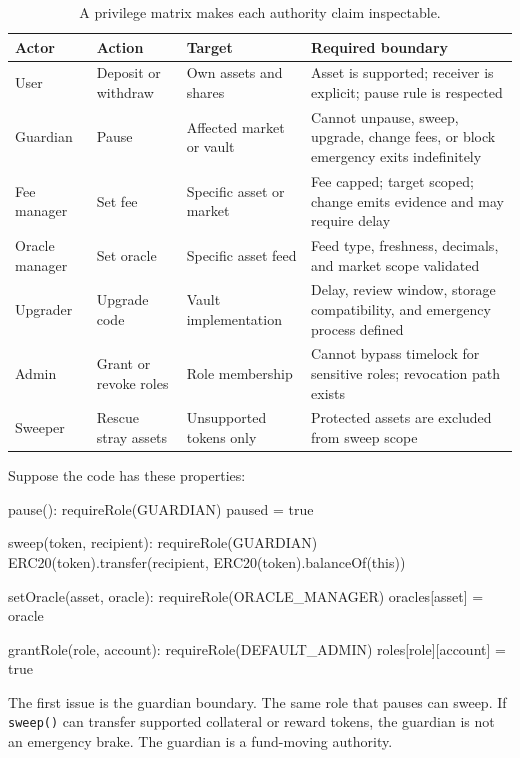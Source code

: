 \begin{table}[htbp]
\centering
\small
\renewcommand{\arraystretch}{1.15}
\begin{tabularx}{\textwidth}{@{}>{\RaggedRight\arraybackslash}p{}>{\RaggedRight\arraybackslash}p{}>{\RaggedRight\arraybackslash}p{}X@{}}
\toprule
Actor & Action & Target & Required boundary \\
\midrule
User & Deposit or withdraw & Own assets and shares & Asset is supported; receiver is explicit; pause rule is respected \\
Guardian & Pause & Affected market or vault & Cannot unpause, sweep, upgrade, change fees, or block emergency exits indefinitely \\
Fee manager & Set fee & Specific asset or market & Fee capped; target scoped; change emits evidence and may require delay \\
Oracle manager & Set oracle & Specific asset feed & Feed type, freshness, decimals, and market scope validated \\
Upgrader & Upgrade code & Vault implementation & Delay, review window, storage compatibility, and emergency process defined \\
Admin & Grant or revoke roles & Role membership & Cannot bypass timelock for sensitive roles; revocation path exists \\
Sweeper & Rescue stray assets & Unsupported tokens only & Protected assets are excluded from sweep scope \\
\bottomrule
\end{tabularx}
\caption{A privilege matrix makes each authority claim inspectable.}
\end{table}

Suppose the code has these properties:

\begin{codeblock}
pause():
    requireRole(GUARDIAN)
    paused = true

sweep(token, recipient):
    requireRole(GUARDIAN)
    ERC20(token).transfer(recipient, ERC20(token).balanceOf(this))

setOracle(asset, oracle):
    requireRole(ORACLE_MANAGER)
    oracles[asset] = oracle

grantRole(role, account):
    requireRole(DEFAULT_ADMIN)
    roles[role][account] = true
\end{codeblock}

The first issue is the guardian boundary. The same role that pauses can sweep. If \texttt{sweep()} can transfer supported collateral or reward tokens, the guardian is not an emergency brake. The guardian is a fund-moving authority.

